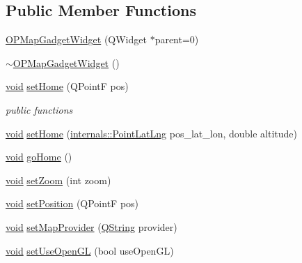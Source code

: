 \subsection*{\-Public \-Member \-Functions}
\begin{DoxyCompactItemize}
\item 
\hyperlink{group___o_p_map_plugin_ga7fe62a2d1a8b920f3e44900dee8d9d5a}{\-O\-P\-Map\-Gadget\-Widget} (\-Q\-Widget $\ast$parent=0)
\item 
\hyperlink{group___o_p_map_plugin_ga7c7775d0011bd9d0f8ca0219f48bc193}{$\sim$\-O\-P\-Map\-Gadget\-Widget} ()
\item 
\hyperlink{group___u_a_v_objects_plugin_ga444cf2ff3f0ecbe028adce838d373f5c}{void} \hyperlink{group___o_p_map_plugin_gaea4b659a9476e351373fc6df96026327}{set\-Home} (\-Q\-Point\-F pos)
\begin{DoxyCompactList}\small\item\em public functions \end{DoxyCompactList}\item 
\hyperlink{group___u_a_v_objects_plugin_ga444cf2ff3f0ecbe028adce838d373f5c}{void} \hyperlink{group___o_p_map_plugin_ga7eaa4b0e19be1df614f49d7b86393a19}{set\-Home} (\hyperlink{structinternals_1_1_point_lat_lng}{internals\-::\-Point\-Lat\-Lng} pos\-\_\-lat\-\_\-lon, double altitude)
\item 
\hyperlink{group___u_a_v_objects_plugin_ga444cf2ff3f0ecbe028adce838d373f5c}{void} \hyperlink{group___o_p_map_plugin_gab81157189920148cb4178548aeef4b92}{go\-Home} ()
\item 
\hyperlink{group___u_a_v_objects_plugin_ga444cf2ff3f0ecbe028adce838d373f5c}{void} \hyperlink{group___o_p_map_plugin_gaa2731b7fb965c417860b30ac354437ca}{set\-Zoom} (int zoom)
\item 
\hyperlink{group___u_a_v_objects_plugin_ga444cf2ff3f0ecbe028adce838d373f5c}{void} \hyperlink{group___o_p_map_plugin_ga4c9793fea42fd12ba9f7f27c25f98523}{set\-Position} (\-Q\-Point\-F pos)
\item 
\hyperlink{group___u_a_v_objects_plugin_ga444cf2ff3f0ecbe028adce838d373f5c}{void} \hyperlink{group___o_p_map_plugin_gab677b7feb42a6edd833e63325d2a928b}{set\-Map\-Provider} (\hyperlink{group___u_a_v_objects_plugin_gab9d252f49c333c94a72f97ce3105a32d}{\-Q\-String} provider)
\item 
\hyperlink{group___u_a_v_objects_plugin_ga444cf2ff3f0ecbe028adce838d373f5c}{void} \hyperlink{group___o_p_map_plugin_ga98807be867cfbdd8a0eeb05835b63a75}{set\-Use\-Open\-G\-L} (bool use\-Open\-G\-L)
\item 

\end{DoxyCompactItemize}
